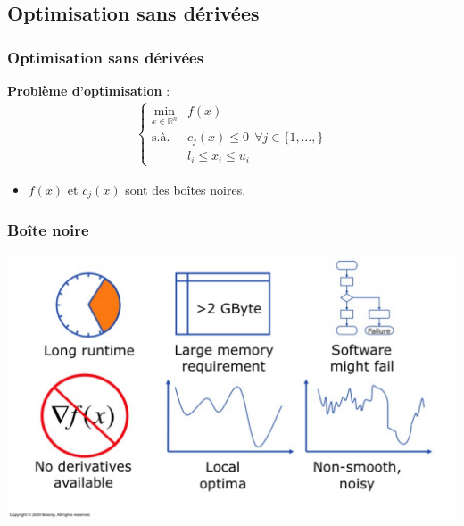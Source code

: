 \documentclass{beamer}
\newcommand{\R}{\mathbb{R}}
\begin{document}
\subsection{Optimisation sans dérivées}
\begin{frame} %
\frametitle{Optimisation sans dérivées}
\textbf{Problème d'optimisation} :
\begin{align*}
	\begin{cases}
		\underset{x\in \R^n}{\min} & f(x) \\
		\text{s.à.} & c_j(x) \leq 0 ~ ~ \forall j \in \{1,\dots,\}\\
		~ & l_i \leq x_i \leq u_i
	\end{cases}
\end{align*}
\begin{itemize}
	\pause
	\item $f(x)$ et $c_j(x)$ sont des boîtes noires.
\end{itemize}
\bigskip
\end{frame}
\begin{frame}%
	\frametitle{Boîte noire}
	\includegraphics[width=\linewidth]{blackbox.png}
\end{frame}
\end{document}
